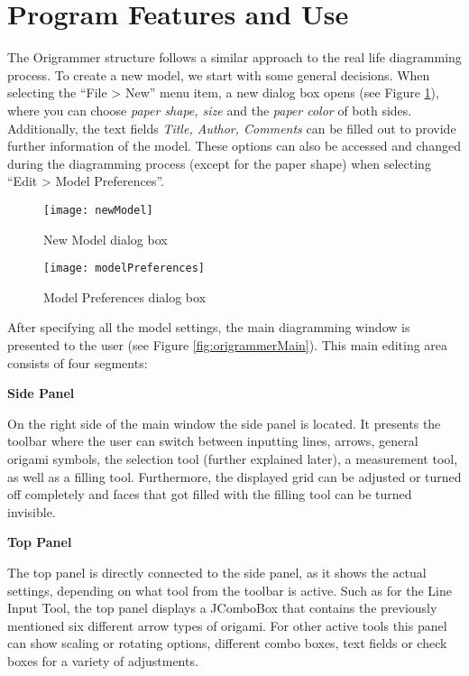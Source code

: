 
\section{Program Features and Use}
\label{program}

The Origrammer structure follows a similar approach to the real life diagramming process. To create a new model, we start with some general decisions. When selecting the ``File > New'' menu item, a new dialog box opens (see Figure \ref{fig:newModel}), where you can choose \emph{paper shape, size} and the \emph{paper color} of both sides. Additionally, the text fields \emph{Title, Author, Comments} can be filled out to provide further information of the model. These options can also be accessed and changed during the diagramming process (except for the paper shape) when selecting ``Edit > Model Preferences''. 

\begin{figure}[h]
	\centering
	\texttt{[image: newModel]}
	\caption{New Model dialog box}
	\label{fig:newModel}
\end{figure}


\begin{figure}[h]
	\centering
	\texttt{[image: modelPreferences]}
	\caption{Model Preferences dialog box}
	\label{fig:modelPreferences}
\end{figure}

After specifying all the model settings, the main diagramming window is presented to the user (see Figure \ref{fig:origrammerMain}). This main editing area consists of four segments:


\textbf{Side Panel}

On the right side of the main window the side panel is located. It presents the toolbar where the user can switch between inputting lines, arrows, general origami symbols, the selection tool (further explained later), a measurement tool, as well as a filling tool. Furthermore, the displayed grid can be adjusted or turned off completely and faces that got filled with the filling tool can be turned invisible.

\textbf{Top Panel}

The top panel is directly connected to the side panel, as it shows the actual settings, depending on what tool from the toolbar is active. Such as for the Line Input Tool, the top panel displays a JComboBox that contains the previously mentioned six different arrow types of origami. For other active tools this panel can show scaling or rotating options, different combo boxes, text fields or check boxes for a variety of adjustments.

